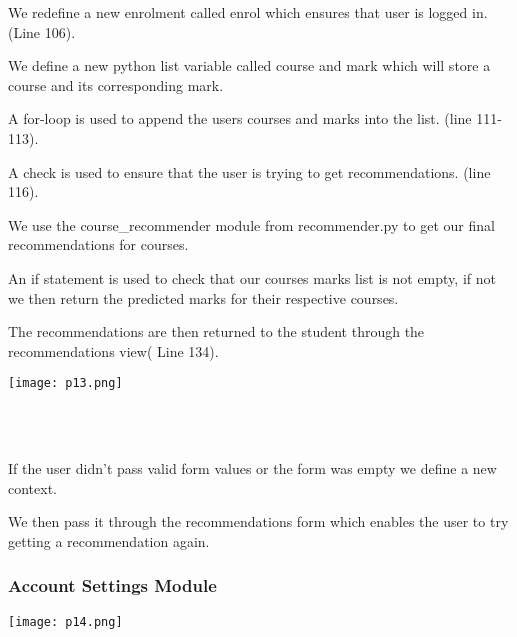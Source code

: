 \documentclass[10pt]{article}
\begin{document}
\begin{description}[font=$\bullet$~\normalfont\scshape\color{red!50!black}]
\item [] We redefine a new enrolment called enrol which ensures that user is logged in.(Line 106). 
\item [] We define a new python list variable called course and mark which will store a course and its corresponding mark.
\item [] A for-loop is used to append the users courses and marks into the list. (line 111-113).
\item [] A check is used to ensure that the user is trying to get recommendations. (line 116).
\item [] We use the course\_recommender module from recommender.py to get our final recommendations for courses.
\item [] An if statement is used to check that our courses marks list is not empty, if not we then return the predicted marks for their respective courses.
\item [] The recommendations are then returned to the student through the recommendations view( Line 134).

\begin{center}
\texttt{[image: p13.png]}
\end{center} \\ \\

\item [] If the user didn’t pass valid form values or the form was empty we define a new context.

\item [] We then pass it through the recommendations form which enables the user to try getting  a recommendation again.

\end{description}

\subsubsection{Account Settings Module}

\begin{center}
\texttt{[image: p14.png]}
\end{center} \\ \\
\end{document}
